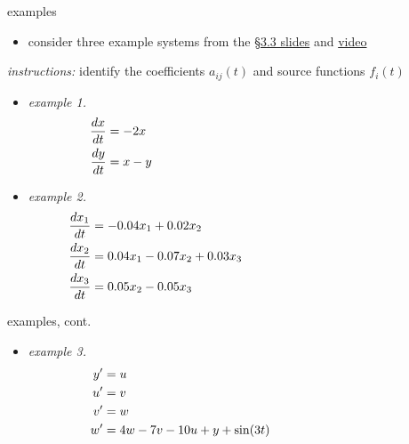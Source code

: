 \documentclass[urlcolor=blue,dvipsnames]{beamer}
\begin{document}
\begin{frame}{examples}

\small
\begin{itemize}
\item consider three example systems from the \href{https://bueler.github.io/math302/assets/slides/3-3.pdf}{\S3.3 slides} and \href{https://drive.explaineverything.com/thecode/XAAUNGS}{video}
\end{itemize}

\noindent \emph{instructions:} identify the coefficients $a_{ij}(t)$ and source functions $f_i(t)$

\begin{itemize}
\item \emph{example 1.}
\begin{align*}
\frac{dx}{dt} &= - 2 x \hspace{70mm} \\
\frac{dy}{dt} &= x - y
\end{align*}
\item \emph{example 2.}
\begin{align*}
\frac{dx_1}{dt} &= -0.04 x_1 + 0.02 x_2 \hspace{60mm} \\
\frac{dx_2}{dt} &= 0.04 x_1 - 0.07 x_2 + 0.03 x_3 \\
\frac{dx_3}{dt} &= 0.05 x_2 - 0.05 x_3
\end{align*}
\end{itemize}
\end{frame}


\begin{frame}{examples, cont.}

\small
\begin{itemize}
\item \emph{example 3.}
\begin{align*}
y' &= u \hspace{75mm} \\
u' &= v \\
v' &= w \\
w' &= 4w-7v-10u+y+\sin(3t)
\end{align*}
\end{itemize}

\vspace{40mm}
\end{frame}
\end{document}
